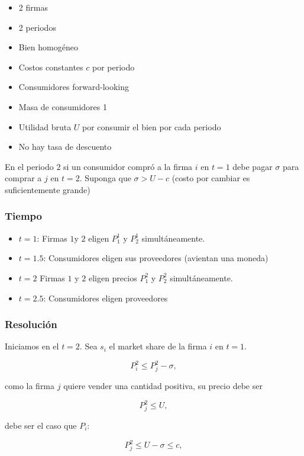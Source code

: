 \documentclass[letterpaper,12pt,twocolumn]{report}
\begin{document}
\begin{tcolorbox}[title=Supuestos]
	\begin{itemize}
		\item 2 firmas
		\item 2 periodos
		\item Bien homogéneo
		\item Costos constantes $c$ por periodo
		\item Consumidores forward-looking
		\item Masa de consumidores 1 
		\item Utilidad bruta $U$ por consumir el bien por cada periodo
		\item No hay tasa de descuento
	\end{itemize}
\end{tcolorbox}

En el periodo $2$ si un consumidor compró a la firma $i$ en $t=1$ debe pagar $\sigma$ para comprar a $j$ en $t=2$. Suponga que $\sigma>U-c$ (costo por cambiar es suficientemente grande)

\subsubsection*{Tiempo}

\begin{itemize}
	\item $t=1$: Firmas $1$y $2$ eligen $P_1^1$ y $P_2^1$ simultáneamente.
	\item  $t=1.5$: Consumidores eligen sus proveedores (avientan una moneda)
	\item $t=2$ Firmas $1$ y $2$ eligen precios $P_1^2$ y $P_2^2$ simultáneamente.
	\item $t=2.5$: Consumidores eligen proveedores
\end{itemize}

\subsubsection*{Resolución}

Iniciamos en el $t=2$. Sea $s_i$ el market share de la firma $i$ en  $t=1$.

$$ P_i^2 \leq P_j^2-\sigma, $$

como la firma $j$ quiere vender una cantidad positiva, su precio debe ser 

$$P_j^2\leq U,$$

debe ser el caso que $P_i$:

$$P_j^2\leq U-\sigma \leq c, $$
\end{document}
